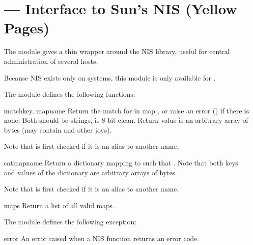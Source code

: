 \section{ ---
         Interface to Sun's NIS (Yellow Pages)}


The  module gives a thin wrapper around the NIS library, useful
for central administration of several hosts.

Because NIS exists only on \UNIX{} systems, this module is
only available for \UNIX.

The  module defines the following functions:

\begin{funcdesc}{match}{key, mapname}
Return the match for  in map , or raise an
error () if there is none.
Both should be strings,  is 8-bit clean.
Return value is an arbitrary array of bytes (may contain 
and other joys).

Note that  is first checked if it is an alias to another
name.
\end{funcdesc}

\begin{funcdesc}{cat}{mapname}
Return a dictionary mapping  to  such that
.
Note that both keys and values of the dictionary are arbitrary
arrays of bytes.

Note that  is first checked if it is an alias to another
name.
\end{funcdesc}

\begin{funcdesc}{maps}{}
Return a list of all valid maps.
\end{funcdesc}


The  module defines the following exception:

\begin{excdesc}{error}
An error raised when a NIS function returns an error code.
\end{excdesc}
